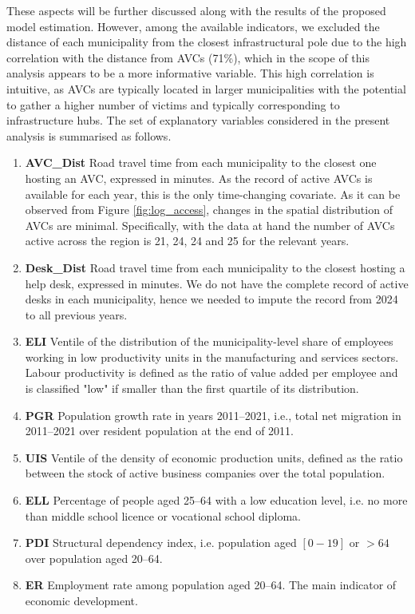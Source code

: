 \documentclass[openany, 11pt, oneside]{book}
\begin{document}
These aspects will be further discussed along with the results of the proposed model estimation. However, among the available indicators, we excluded the distance of each municipality from the closest infrastructural pole \parencite{InnerAreas} due to the high correlation with the distance from AVCs (71\%), which in the scope of this analysis appears to be a more informative variable. This high correlation is intuitive, as AVCs are typically located in larger municipalities with the potential to gather a higher number of victims and typically corresponding to infrastructure hubs.
%
The set of explanatory variables considered in the present analysis is summarised as follows.
\begin{enumerate}
\item{\textbf{AVC\_Dist}} Road travel time from each municipality to the closest one hosting an AVC, expressed in minutes. As the record of active AVCs is available for each year, this is the only time-changing covariate. As it can be observed from Figure \ref{fig:log_access}, changes in the spatial distribution of AVCs are minimal. Specifically, with the data at hand the number of AVCs active across the region is 21, 24, 24 and 25 for the relevant years.

\item{\textbf{Desk\_Dist}} Road travel time from each municipality to the closest hosting a help desk, expressed in minutes. We do not have the complete record of active desks in each municipality, hence we needed to impute the record from 2024 to all previous years.

\item{\textbf{ELI}} Ventile of the distribution of the municipality-level share of employees working in low productivity units in the manufacturing and services sectors. Labour productivity is defined as the ratio of value added per employee and is classified "low" if smaller than the first quartile of its distribution.

\item{\textbf{PGR}} Population growth rate in years 2011--2021, i.e., total net migration in 2011--2021 over resident population at the end of 2011.

\item{\textbf{UIS}} Ventile of the density of economic production units, defined as the ratio between the stock of active business companies over the total population.

\item{\textbf{ELL}} Percentage of people aged 25--64 with a low education level, i.e. no more than middle school licence or vocational school diploma. 

\item{\textbf{PDI}} Structural dependency index, i.e. population aged $[0-19]$ or $>64$ over population aged 20--64.

\item{\textbf{ER}}  Employment rate among population aged 20--64. The main indicator of economic development.
\end{enumerate}
\end{document}
